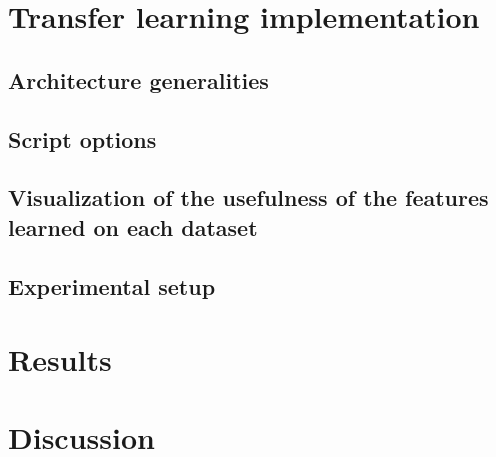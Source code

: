 \section{Transfer learning implementation}
\subsection{Architecture generalities}
\subsection{Script options}
\subsection{Visualization of the usefulness of the features learned on each dataset}
\subsection{Experimental setup}
\section{Results}

\section{Discussion}